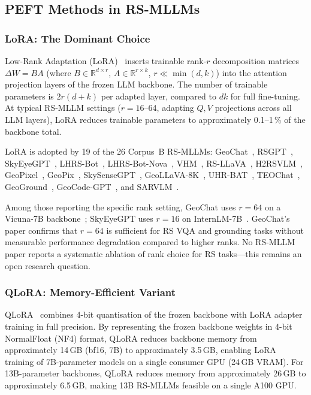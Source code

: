 \subsection{PEFT Methods in RS-MLLMs}\label{sec6:peft}

\subsubsection{LoRA: The Dominant Choice}\label{sec6:lora}

Low-Rank Adaptation (LoRA)~\cite{hu2022lora} inserts trainable rank-$r$
decomposition matrices $\Delta W = BA$ (where $B \in \mathbb{R}^{d \times r}$,
$A \in \mathbb{R}^{r \times k}$, $r \ll \min(d,k)$) into the attention
projection layers of the frozen LLM backbone. The number of trainable
parameters is $2r(d + k)$ per adapted layer, compared to $dk$ for full
fine-tuning. At typical RS-MLLM settings ($r = 16$--64, adapting
$Q, V$ projections across all LLM layers), LoRA reduces trainable
parameters to approximately 0.1--1\,\% of the backbone total.

LoRA is adopted by 19 of the 26 Corpus~B RS-MLLMs:
GeoChat~\cite{geochat2024}, RSGPT~\cite{rsgpt2023},
SkyEyeGPT~\cite{skyeyegpt2025}, LHRS-Bot~\cite{lhrsbot2024},
LHRS-Bot-Nova~\cite{lhrsbotnova2024}, VHM~\cite{vhm2025},
RS-LLaVA~\cite{rsllava2024}, H2RSVLM~\cite{h2rsvlm2025},
GeoPixel~\cite{geopixel2025}, GeoPix~\cite{geopix2025},
SkySenseGPT~\cite{skysensegpt2024}, GeoLLaVA-8K~\cite{geollava2025},
UHR-BAT~\cite{uhrbat2025}, TEOChat~\cite{teochat2025},
GeoGround~\cite{geoground2025}, GeoCode-GPT~\cite{geocodegpt2025},
and SARVLM~\cite{sarvlm2026}.

Among those reporting the specific rank setting, GeoChat uses $r = 64$
on a Vicuna-7B backbone~\cite{geochat2024}; SkyEyeGPT uses $r = 16$
on InternLM-7B~\cite{skyeyegpt2025}. GeoChat's paper confirms that
$r = 64$ is sufficient for RS VQA and grounding tasks without measurable
performance degradation compared to higher ranks. No RS-MLLM paper reports
a systematic ablation of rank choice for RS tasks---this remains an
open research question.

\subsubsection{QLoRA: Memory-Efficient Variant}\label{sec6:qlora}

QLoRA~\cite{dettmers2023qlora} combines 4-bit quantisation of the frozen
backbone with LoRA adapter training in full precision. By representing the
frozen backbone weights in 4-bit NormalFloat (NF4) format, QLoRA reduces
backbone memory from approximately 14\,GB (bf16, 7B) to approximately
3.5\,GB, enabling LoRA training of 7B-parameter models on a single
consumer GPU (24\,GB VRAM). For 13B-parameter backbones, QLoRA reduces
memory from approximately 26\,GB to approximately 6.5\,GB, making
13B RS-MLLMs feasible on a single A100 GPU.

